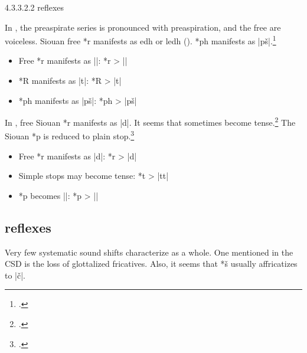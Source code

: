 \documentclass[output=paper]{LSP/langsci}
\begin{document}
4.3.3.2.2   reflexes
\vspace{1em}

In , the preaspirate series is pronounced with preaspiration, and the free  are voiceless.  Siouan free *r manifests as edh or ledh ().  *ph manifests as |pš|.\footnote{ \citealt[64]{Rankinetal2006PDF}.} 

\begin{itemize}
\item Free *r manifests as ||: \hspace{1em} *r	>	||
\item *R manifests as |t|: \hspace{3em} *R	>	|t|
\item *ph manifests as |pš|: \hspace{2em} *ph	>	|pš|
\end{itemize}


In , free Siouan *r manifests as |d|.  It seems that  sometimes become tense.\footnote{\citealt[833]{Rankinetal2006PDF}.} The Siouan  *p\textsuperscript{} is reduced to plain  stop.\footnote{\citealt[831]{Rankinetal2006PDF}.} 

\begin{itemize}
\item Free *r manifests as |d|: \hspace{5em} *r	>	|d|
\item Simple stops may become tense:	\hspace{1em} *t	>	|tt|
\item *p\textsuperscript{} becomes |\textsuperscript{}|: \hspace{8em} *p\textsuperscript{}	>	|\textsuperscript{}|
\end{itemize}

\subsection{ reflexes}

Very few systematic sound shifts characterize  as a whole.  One mentioned in the CSD is the loss of glottalized fricatives.  Also, it seems that *š usually affricatizes to |\v{c}|.
\end{document}
